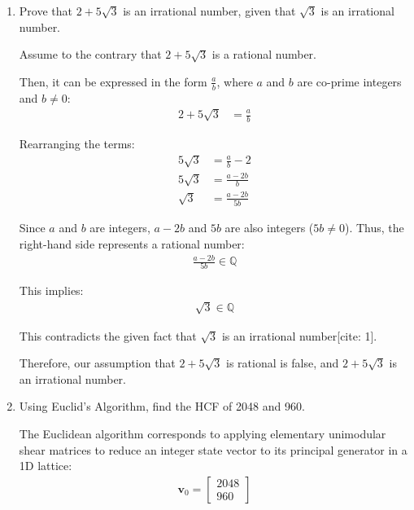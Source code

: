 \begin{enumerate}[label=\thesubsection.\arabic*, ref=\thesubsection.\theenumi]
	Therefore, the values of $A$ and $B$ are:
	\begin{align*}
		A &= 30^\circ &	B = 15^\circ
	\end{align*}
	
	\item  Prove that $2+5\sqrt{3}$ is an irrational number, given that $\sqrt{3}$ is an irrational number.
	
	\solution
	Assume to the contrary that $2 + 5\sqrt{3}$ is a rational number.
	
	Then, it can be expressed in the form $\frac{a}{b}$, where $a$ and $b$ are co-prime integers and $b \neq 0$:
	\begin{align*}
		2 + 5\sqrt{3} &= \frac{a}{b}
	\end{align*}
	
	Rearranging the terms:
	\begin{align*}
		5\sqrt{3} &= \frac{a}{b} - 2 \\
		5\sqrt{3} &= \frac{a - 2b}{b} \\
		\sqrt{3} &= \frac{a - 2b}{5b}
	\end{align*}
	
	Since $a$ and $b$ are integers, $a - 2b$ and $5b$ are also integers ($5b \neq 0$). Thus, the right-hand side represents a rational number:
	\begin{align*}
		\frac{a - 2b}{5b} \in \mathbb{Q}
	\end{align*}
	
	This implies:
	\begin{align*}
		\sqrt{3} \in \mathbb{Q}
	\end{align*}
	
	This contradicts the given fact that $\sqrt{3}$ is an irrational number[cite: 1].
	
	Therefore, our assumption that $2 + 5\sqrt{3}$ is rational is false, and $2 + 5\sqrt{3}$ is an irrational number.
	
	\item Using Euclid's Algorithm, find the HCF of 2048 and 960.
	
	\solution
	The Euclidean algorithm corresponds to applying elementary unimodular shear matrices to reduce an integer state vector to its principal generator in a 1D lattice:
	\begin{align*}
		\mathbf{v}_0 = \begin{bmatrix} 2048 \\ 960 \end{bmatrix}
	\end{align*}
	

\end{enumerate}
